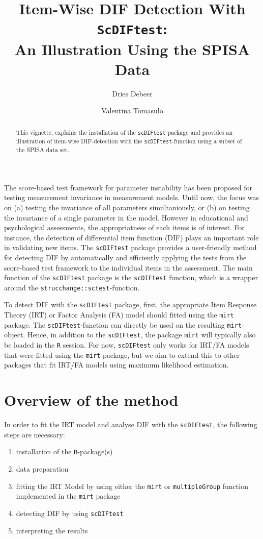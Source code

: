 \documentclass{article}
\title{Item-Wise DIF Detection With {\tt ScDIFtest}: \\
An Illustration Using the SPISA Data}
\author[1, 2]{Dries Debeer}
\author[2]{Valentina Tomasulo}
\affil[1]{ITEC, imec research group at KULeuven}
\affil[2]{Univeristy of Zurich}
\begin{document}
\maketitle

\begin{abstract}
This vignette, explains the installation of the {\tt scDIFtest} package and provides an illustration of item-wise DIF-detection with the {\tt scDIFtest}-function using a subset of the SPISA data set.
\end{abstract}


The score-based test framework for parameter instability has been proposed for testing measurement invariance in measurement models. Until now, the focus was on (a) testing the invariance of all parameters simultaniously, or (b) on testing the invariance of a single parameter in the model. However in educational and psychological assessments, the appropriatness of each items is of interest. For instance, the detection of differential item function (DIF) plays an important role in validating new items. The {\tt scDIFtest} package provides a user-friendly method for detecting DIF by automatically and efficiently applying the tests from the score-based test framework to the individual items in the assessment. The main function of the {\tt scDIFtest} package is the {\tt scDIFtest} function, which is a wrapper around the {\tt strucchange::sctest}-function. 


To detect DIF with the {\tt scDIFtest} package, first, the appropriate Item Response Theory (IRT) or Factor Analysis (FA) model should fitted using the {\tt mirt} package. The {\tt scDIFtest}-function can directly be used on the resulting {\tt mirt}-object. Hence, in addition to the {\tt scDIFtest}, the package {\tt mirt} will typically also be loaded in the {\tt R} session. For now, {\tt scDIFtest} only works for IRT/FA models that were fitted using the {\tt mirt} package, but we aim to extend this to other packages that fit IRT/FA models using maximum likelihood estimation. 



\section*{Overview of the method}

In order to fit the IRT model and analyse DIF with the {\tt scDIFtest}, the following steps are necessary:

\begin{enumerate}
\item installation of the {\tt R}-package(s)
\item data preparation
\item fitting the IRT Model by using either the {\tt mirt} or {\tt multipleGroup} function implemented in the {\tt mirt} package \cite{Chalmers}
\item detecting DIF by using {\tt scDIFtest} \cite{Debeer}
\item interpreting the results
\end{enumerate} 
\end{document}
